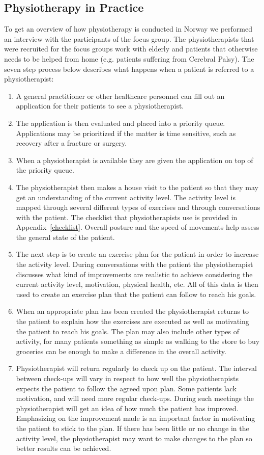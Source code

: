 \subsection{Physiotherapy in Practice} 
\label{sec:physiotherapyPractice}
To get an overview of how physiotherapy is conducted in Norway we performed an interview with the participants of the focus group. The physiotherapists that were recruited for the focus groups work with elderly and patients that otherwise needs to be helped from home (e.g. patients suffering from Cerebral Palsy). The seven step process below describes what happens when a patient is referred to a physiotherapist:

\begin{enumerate}
  \item A general practitioner or other healthcare personnel can fill out an application for their patients to see a physiotherapist.
  \item The application is then evaluated and placed into a priority queue. Applications may be prioritized if the matter is time sensitive, such as recovery after a fracture or surgery.
  \item When a physiotherapist is available they are given the application on top of the priority queue.
  \item The physiotherapist then makes a house visit to the patient so that they may get an understanding of the current activity level. The activity level is mapped through several different types of exercises and through conversations with the patient. The checklist that physiotherapists use is provided in Appendix~\ref{checklist}. Overall posture and the speed of movements help assess the general state of the patient.
  \item The next step is to create an exercise plan for the patient in order to increase the activity level. During conversations with the patient the physiotherapist discusses what kind of improvements are realistic to achieve considering the current activity level, motivation, physical health, etc. All of this data is then used to create an exercise plan that the patient can follow to reach his goals.
  \item When an appropriate plan has been created the physiotherapist returns to the patient to explain how the exercises are executed as well as motivating the patient to reach his goals. The plan may also include other types of activity, for many patients something as simple as walking to the store to buy groceries can be enough to make a difference in the overall activity.
  \item Physiotherapist will return regularly to check up on the patient. The interval between check-ups will vary in respect to how well the physiotherapists expects the patient to follow the agreed upon plan. Some patients lack motivation, and will need more regular check-ups. During such meetings the physiotherapist will get an idea of how much the patient has improved. Emphasizing on the improvement made is an important factor in motivating the patient to stick to the plan. If there has been little or no change in the activity level, the physiotherapist may want to make changes to the plan so better results can be achieved.
\end{enumerate}

